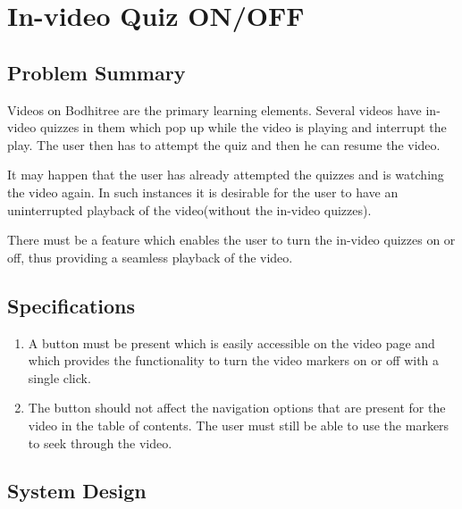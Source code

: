 \section{In-video Quiz ON/OFF}

\subsection*{Problem Summary}

\hspace{0.35cm} Videos on Bodhitree are the primary learning elements. Several videos have in-video quizzes in them which pop up while the video is playing and interrupt the play. The user then has to attempt the quiz and then he can resume the video.
\par It may happen that the user has already attempted the quizzes and is watching the video again. In such instances it is desirable for the user to have an uninterrupted playback of the video(without the in-video quizzes).
\par There must be a feature which enables the user to turn the in-video quizzes on or off, thus providing a seamless playback of the video.

\subsection*{Specifications}

\begin{enumerate}
	\item A button must be present which is easily accessible on the video page and which provides the functionality to turn the video markers on or off with a single click.
	\item The button should not affect the navigation options that are present for the video in the table of contents. The user must still be able to use the markers to seek through the video.
\end{enumerate}

\subsection*{System Design}

